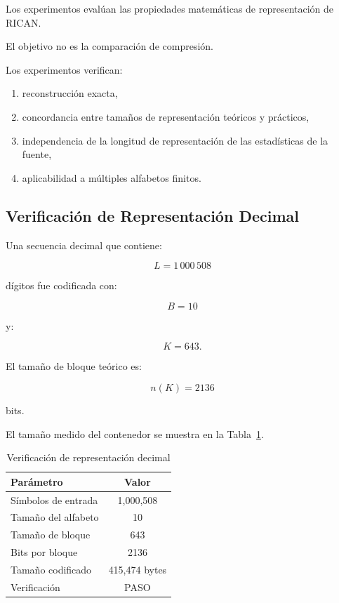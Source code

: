 \documentclass[onecolumn]{IEEEtran}
\begin{document}
Los experimentos evalúan las propiedades matemáticas de representación
de RICAN.

El objetivo no es la comparación de compresión.

Los experimentos verifican:

\begin{enumerate}

\item reconstrucción exacta,

\item concordancia entre tamaños de representación teóricos y
prácticos,

\item independencia de la longitud de representación de las
estadísticas de la fuente,

\item aplicabilidad a múltiples alfabetos finitos.

\end{enumerate}

\subsection{Verificación de Representación Decimal}

Una secuencia decimal que contiene:

\[
L=1\,000\,508
\]

dígitos fue codificada con:

\[
B=10
\]

y:

\[
K=643 .
\]

El tamaño de bloque teórico es:

\[
n(K)=2136
\]

bits.

El tamaño medido del contenedor se muestra en la
Tabla~\ref{tab:decimal-validation}.

\begin{table}[!t]
\caption{Verificación de representación decimal}
\label{tab:decimal-validation}
\centering
\begin{tabular}{lc}
\toprule
Parámetro & Valor\\
\midrule
Símbolos de entrada & 1,000,508\\
Tamaño del alfabeto & 10\\
Tamaño de bloque & 643\\
Bits por bloque & 2136\\
Tamaño codificado & 415,474 bytes\\
Verificación & PASO\\
\bottomrule
\end{tabular}
\end{table}
\end{document}
